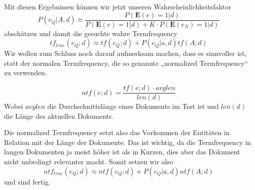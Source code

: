 Mit diesen Ergebnissen können wir jetzt unseren Wahrscheinlichkeitsfaktor 
\[P(e_Q | A,d) \approx \frac{P(\textbf{E}(e) = 1 | d)}{P(\textbf{E}(e) = 1 | d) + K \cdot P(\textbf{E}(e_N) = 1 | d)} \]
abschätzen und damit die gesuchte wahre Termfrequency
\[ tf_{true}(e_Q;d) \approx tf(e_Q;d) + P(e_Q|a,d)tf(A;d) \]
Wir wollen zum Schluss noch darauf aufmerksam machen, dass es sinnvoller ist, statt der normalen Termfrequency, die so genannte „normalized Termfrequency“ zu verwenden.\\
\begin{defi}
\[ ntf(e;d) = \frac{tf(e;d) \cdot avglen}{len(d)} \]
Wobei $avglen$ die Durchschnittslänge eines Dokuments im Test ist und $len(d)$ die Länge des aktuellen Dokuments.
\end{defi}
Die normalized Termfrequency setzt also das Vorkommen der Entitäten in Relation mit der Länge der Dokumente. Das ist wichtig, da die Termfrequency in langen Dokumenten ja meist höher ist als in Kurzen, dies aber das Dokument nicht unbedingt relevanter macht.
Somit setzen wir also
\[ ntf_{true}(e_Q;d) \approx ntf(e_Q;d) + P(e_Q|a,d)ntf(A;d) \]
und sind fertig.
